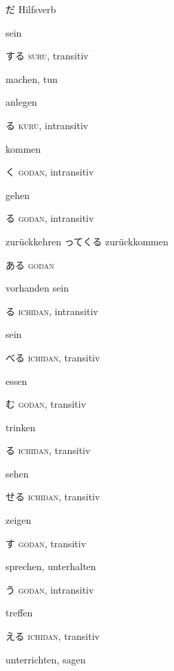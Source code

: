 \vocab
  {だ  }
  {Hilfsverb}
  {\item sein}

\vocab
  {する   }
  {\textsc{suru}, transitiv}
  {\item machen, tun
   \item anlegen 
   }

\vocab
  {る  
  }
  {\textsc{kuru}, intransitiv}
  {\item kommen}

\vocab
  {く }
  {\textsc{godan}, intransitiv}
  {\item gehen}

\vocab
    {る}
    {\textsc{godan}, intransitiv}
    {\item zurückkehren
     \example
      {ってくる}
      {zurückkommen}
    }

\vocab
  {ある }
  {\textsc{godan}}
  {\item vorhanden sein}

\vocab
  {る}
  {\textsc{ichidan}, intransitiv}
  {\item {} sein}

\vocab
  {べる}
  {\textsc{ichidan}, transitiv}
  {\item essen}

\vocab
  {む}
  {\textsc{godan}, transitiv}
  {\item trinken}

\vocab
  {る}
  {\textsc{ichidan}, transitiv}
  {\item sehen}

\vocab
  {せる}
  {\textsc{ichidan}, transitiv}
  {\item zeigen}

\vocab
    {す}
    {\textsc{godan}, transitiv}
    {\item sprechen, unterhalten}

\vocab
    {う}
    {\textsc{godan}, intransitiv}
    {\item treffen}

\vocab
    {える}
    {\textsc{ichidan}, transitiv}
    {\item unterrichten,  sagen}

